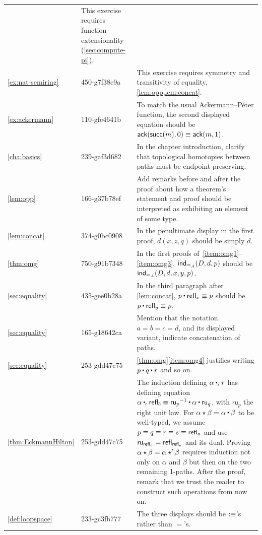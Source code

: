 \documentclass[
%
%
11pt %
]{article}
\newcounter{chapter}            %
\begin{document}
\begin{longtable}{llp{10.5cm}}
  & This exercise requires function extensionality (\cref{sec:compute-pi}).\\
  \cref{ex:nat-semiring}
  & 450-g7f38c9a
  & This exercise requires symmetry and transitivity of equality, \cref{lem:opp,lem:concat}.\\
  \cref{ex:ackermann}
  & 110-gfe4641b
  & To match the usual Ackermann--P\'eter function, the second displayed equation should be $\mathsf{ack}(\mathsf{succ}(m),0) \equiv \mathsf{ack}(m,1)$.\\
  \cref{cha:basics}
  & 239-gaf3d682
  & In the chapter introduction, clarify that topological homotopies between paths must be endpoint-preserving.\\
  \cref{lem:opp}
  & 166-g37b78ef
  & Add remarks before and after the proof about how a theorem's statement and proof should be interpreted as exhibiting an element of some type.\\
  \cref{lem:concat}
  & 374-g0bc0908
  & In the penultimate display in the first proof, $d(x,z,q)$ should be simply $d$.\\
  \cref{thm:omg}
  & 750-g91b7348
  & In the first proofs of~\ref{item:omg1}--\ref{item:omg3}, $\mathsf{ind}_{=_{A}}(D,d,p)$ should be $\mathsf{ind}_{=_{A}}(D,d,x,y,p)$.\\
  \cref{sec:equality}
  & 435-gee0b28a
  & In the third paragraph after \cref{lem:concat}, $p\ct\refl{x}\jdeq p$ should be $p\ct\refl{y}\jdeq p$.\\
  \cref{sec:equality}
  & 165-g18642ca
  & Mention that the notation $a=b=c=d$, and its displayed variant, indicate concatenation of paths.\\
  \cref{sec:equality}
  & 253-gdd47c75
  & \cref{thm:omg}\ref{item:omg4} justifies writing $p\ct q \ct r$ and so on.\\
  \cref{thm:EckmannHilton}
  & 253-gdd47c75
  & The induction defining $\alpha\rightwhisker r$ has defining equation $\alpha \rightwhisker \refl{b} \jdeq \opp{\mathsf{ru}_p} \ct \alpha \ct \mathsf{ru}_q$, with $\mathsf{ru}_p$ the right unit law.
  For $\alpha\hct\beta = \alpha\ct\beta$ to be well-typed, we assume $p\equiv q \equiv r \equiv s\equiv \mathsf{refl}_{a}$ and use $\mathsf{ru}_{\mathsf{refl}_{a}} = \mathsf{refl}_{\mathsf{refl}_{a}}$ and its dual.
  Proving $\alpha\star\beta = \alpha\star'\beta$ requires induction not only on $\alpha$ and $\beta$ but then on the two remaining 1-paths.
  After the proof, remark that we trust the reader to construct such operations from now on.\\
  \cref{def:loopspace}
  & 233-gc3fb777
  & The three displays should be $\vcentcolon\equiv$'s rather than $=$'s.\\

\end{longtable}
\end{document}
